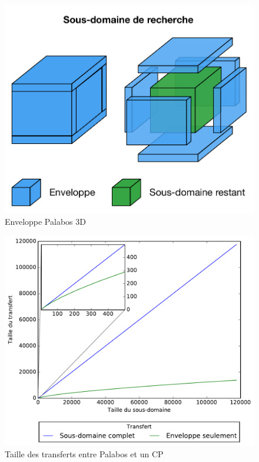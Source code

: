 \begin{figure}[h]
	\centering
	\includegraphics[scale=0.75, fbox]{images/enveloppe_3d_palabos.pdf}
	\caption{Enveloppe Palabos 3D}
	\label{fig:plb_enveloppe_3d}
\end{figure}

\begin{figure}[h]
	\centering
	\includegraphics[scale=0.8, fbox]{../data/full_vs_partial_domain/full_vs_partial.pdf}
	\caption{Taille des transferts entre Palabos et un \ac{CP}}
	\label{fig:plb_full_vs_partial_transfert}
\end{figure}

